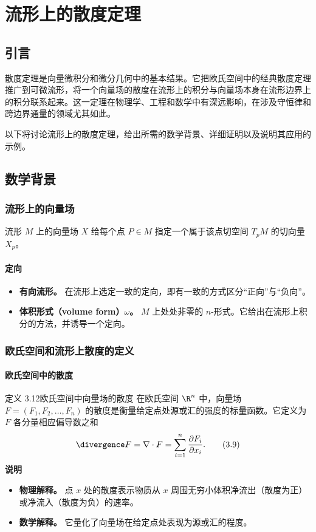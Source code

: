\section{流形上的散度定理}
\label{sec:3.9}
\subsection{引言}
散度定理是向量微积分和微分几何中的基本结果。它把欧氏空间中的经典散度定理推广到可微流形，将一个向量场的散度在流形上的积分与向量场本身在流形边界上的积分联系起来。这一定理在物理学、工程和数学中有深远影响，在涉及守恒律和跨边界通量的领域尤其如此。

以下将讨论流形上的散度定理，给出所需的数学背景、详细证明以及说明其应用的示例。

\subsection{数学背景}
\subsubsection{流形上的向量场}
流形 $M$ 上的向量场 $X$ 给每个点 $P\in M$ 指定一个属于该点切空间 $T_p M$ 的切向量 $X_p$。

\paragraph{定向}
\begin{itemize}
\item \textbf{有向流形。} 在流形上选定一致的定向，即有一致的方式区分“正向”与“负向”。
\item \textbf{体积形式（volume form）$\omega$。} $M$ 上处处非零的 $n$-形式。它给出在流形上积分的方法，并诱导一个定向。
\end{itemize}

\subsubsection{欧氏空间和流形上散度的定义}
\paragraph{欧氏空间中的散度}
\begin{statement}{定义 3.12}{欧氏空间中向量场的散度}
在欧氏空间 $\R^n$ 中，向量场 $F=(F_1,F_2,\dots,F_n)$ 的散度是衡量给定点处源或汇的强度的标量函数。它定义为 $F$ 各分量相应偏导数之和
\begin{equation*}
  \divergence F=\nabla\cdot F=\sum_{i=1}^n\frac{\partial F_i}{\partial x_i}.
  \tag{3.9}\label{eq:3.9}
\end{equation*}
\noindent\textbf{说明}
\begin{itemize}
\item \textbf{物理解释。} 点 $x$ 处的散度表示物质从 $x$ 周围无穷小体积净流出（散度为正）或净流入（散度为负）的速率。
\item \textbf{数学解释。} 它量化了向量场在给定点处表现为源或汇的程度。
\end{itemize}
\end{statement}

